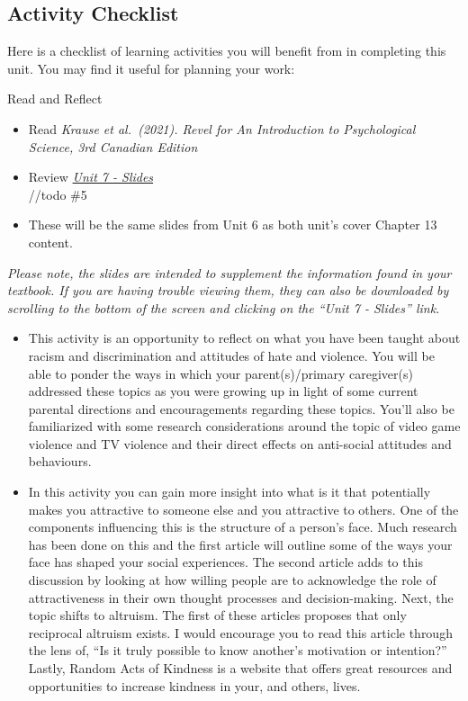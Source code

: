 \documentclass[
]{book}
\providecommand{\tightlist}{%
  \setlength{\itemsep}{0pt}\setlength{\parskip}{0pt}}
\begin{document}
\hypertarget{activity-checklist-6}{%
\subsection*{Activity Checklist}\label{activity-checklist-6}}

Here is a checklist of learning activities you will benefit from in completing this unit. You may find it useful for planning your work:

\begin{reflect}
{Read and Reflect}

\begin{itemize}
\tightlist
\item
  Read \emph{Krause et al.~(2021). Revel for An Introduction to Psychological Science, 3rd Canadian Edition}\\
\item
  Review \href{PSYC106-CH13SocialPsychology-3rdEd.pptx}{\emph{Unit 7 - Slides}}\\
  //todo \#5
\item
  These will be the same slides from Unit 6 as both unit's cover Chapter 13 content.
\end{itemize}

\emph{Please note, the slides are intended to supplement the information found in your textbook. If you are having trouble viewing them, they can also be downloaded by scrolling to the bottom of the screen and clicking on the ``Unit 7 - Slides'' link.}

\begin{itemize}
\item
  This activity is an opportunity to reflect on what you have been taught about racism and discrimination and attitudes of hate and violence. You will be able to ponder the ways in which your parent(s)/primary caregiver(s) addressed these topics as you were growing up in light of some current parental directions and encouragements regarding these topics. You'll also be familiarized with some research considerations around the topic of video game violence and TV violence and their direct effects on anti-social attitudes and behaviours.
\item
  In this activity you can gain more insight into what is it that potentially makes you attractive to someone else and you attractive to others. One of the components influencing this is the structure of a person's face. Much research has been done on this and the first article will outline some of the ways your face has shaped your social experiences. The second article adds to this discussion by looking at how willing people are to acknowledge the role of attractiveness in their own thought processes and decision-making. Next, the topic shifts to altruism. The first of these articles proposes that only reciprocal altruism exists. I would encourage you to read this article through the lens of, ``Is it truly possible to know another's motivation or intention?'' Lastly, Random Acts of Kindness is a website that offers great resources and opportunities to increase kindness in your, and others, lives.
\end{itemize}


\end{reflect}
\end{document}
